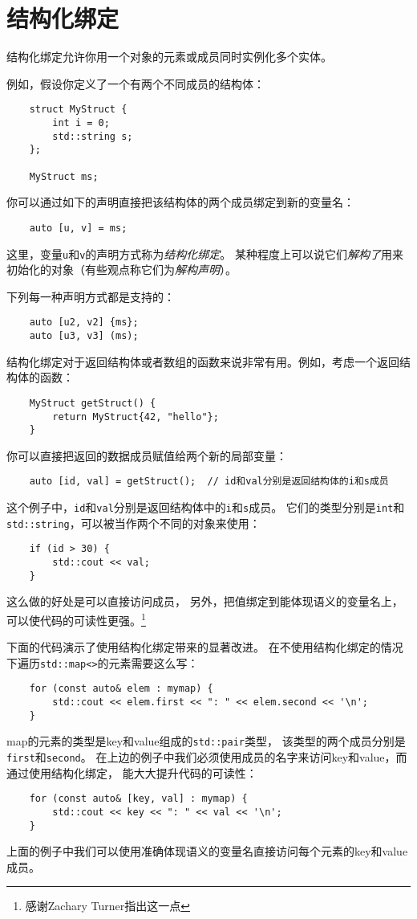 \chapter{结构化绑定}\label{ch1}
结构化绑定允许你用一个对象的元素或成员同时实例化多个实体。

例如，假设你定义了一个有两个不同成员的结构体：
\begin{lstlisting}
    struct MyStruct {
        int i = 0;
        std::string s;
    };

    MyStruct ms;
\end{lstlisting}
你可以通过如下的声明直接把该结构体的两个成员绑定到新的变量名：
\begin{lstlisting}
    auto [u, v] = ms;
\end{lstlisting}
这里，变量\texttt{u}和\texttt{v}的声明方式称为\emph{结构化绑定}。
某种程度上可以说它们\emph{解构了}用来初始化的对象（有些观点称它们为\emph{解构声明}）。

下列每一种声明方式都是支持的：
\begin{lstlisting}
    auto [u2, v2] {ms};
    auto [u3, v3] (ms);
\end{lstlisting}
结构化绑定对于返回结构体或者数组的函数来说非常有用。例如，考虑一个返回结构体的函数：
\begin{lstlisting}
    MyStruct getStruct() {
        return MyStruct{42, "hello"};
    }
\end{lstlisting}
你可以直接把返回的数据成员赋值给两个新的局部变量：
\begin{lstlisting}
    auto [id, val] = getStruct();  // id和val分别是返回结构体的i和s成员
\end{lstlisting}
这个例子中，\texttt{id}和\texttt{val}分别是返回结构体中的\texttt{i}和\texttt{s}成员。
它们的类型分别是\texttt{int}和\texttt{std::string}，可以被当作两个不同的对象来使用：
\begin{lstlisting}
    if (id > 30) {
        std::cout << val;
    }
\end{lstlisting}
这么做的好处是可以直接访问成员，
另外，把值绑定到能体现语义的变量名上，可以使代码的可读性更强。\footnote{感谢Zachary Turner指出这一点}

下面的代码演示了使用结构化绑定带来的显著改进。
在不使用结构化绑定的情况下遍历\texttt{std::map<>}的元素需要这么写：
\begin{lstlisting}
    for (const auto& elem : mymap) {
        std::cout << elem.first << ": " << elem.second << '\n';
    }
\end{lstlisting}
map的元素的类型是key和value组成的\texttt{std::pair}类型，
该类型的两个成员分别是\texttt{first}和\texttt{second}。
在上边的例子中我们必须使用成员的名字来访问key和value，而通过使用结构化绑定，
能大大提升代码的可读性：
\begin{lstlisting}
    for (const auto& [key, val] : mymap) {
        std::cout << key << ": " << val << '\n';
    }
\end{lstlisting}
上面的例子中我们可以使用准确体现语义的变量名直接访问每个元素的key和value成员。

